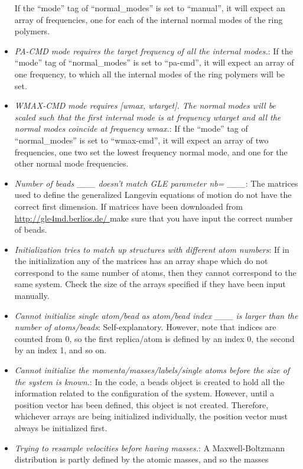 \documentclass[11pt,english,fleqn]{report}
\begin{document}
\begin{itemize}
If the {}``mode'' tag of {}``normal\_modes'' is set to {}``manual'',
it will expect an array of frequencies, one for each of the internal
normal modes of the ring polymers. 
\item \emph{PA-CMD mode requires the target frequency of all the internal modes.}:
If the {}``mode'' tag of {}``normal\_modes'' is set to {}``pa-cmd'',
it will expect an array of one frequency, to which all the internal
modes of the ring polymers will be set. 
\item \emph{WMAX-CMD mode requires [wmax, wtarget]. The normal modes will be scaled such that the first internal mode is at frequency wtarget and all the normal modes coincide at frequency wmax.}:
If the {}``mode'' tag of {}``normal\_modes'' is set to {}``wmax-cmd'',
it will expect an array of two frequencies, one two set the lowest
frequency normal mode, and one for the other normal mode frequencies.
\item \emph{Number of beads \_\_\_ doesn't match GLE parameter nb= \_\_\_}:
The matrices used to define the generalized Langevin equations of
motion do not have the correct first dimension. If matrices have been
downloaded from \url{http://gle4md.berlios.de/ } make sure that you
have input the correct number of beads.
\item \emph{Initialization tries to match up structures with different atom numbers}:
If in the initialization any of the matrices has an array shape which
do not correspond to the same number of atoms, then they cannot correspond
to the same system. Check the size of the arrays specified if they
have been input manually.
\item \emph{Cannot initialize single atom/bead as atom/bead index \_\_\_ is larger than the number of atoms/beads}:
Self-explanatory. However, note that indices are counted from 0, so
the first replica/atom is defined by an index 0, the second by an
index 1, and so on.
\item \emph{Cannot initialize the momenta/masses/labels/single atoms before the size of the system is known.}:
In the code, a beads object is created to hold all the information
related to the configuration of the system. However, until a position
vector has been defined, this object is not created. Therefore, whichever
arrays are being initialized individually, the position vector must
always be initialized first.
\item \emph{Trying to resample velocities before having masses.}: A Maxwell-Boltzmann
distribution is partly defined by the atomic masses, and so the masses

\end{itemize}
\end{document}
